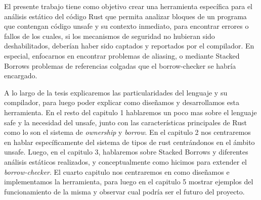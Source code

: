 El presente trabajo tiene como objetivo crear una herramienta específica para el análisis estático del código Rust que permita analizar bloques de un programa que contengan código unsafe y su contexto inmediato, para encontrar errores o fallos de los cuales, si los mecanismos de seguridad no hubieran sido deshabilitados, deberían haber sido captados y reportados por el compilador. En especial, enfocarnos en encontrar problemas de aliasing, o mediante Stacked Borrows problemas de referencias colgadas que el borrow-checker se habría encargado.

A lo largo de la tesis explicaremos las particularidades del lenguaje y su compilador, para luego poder explicar como diseñamos y desarrollamos esta herramienta. En el resto del capitulo 1 hablaremos un poco mas sobre el lenguaje safe y la necesidad del unsafe, junto con las características principales de Rust como lo son el sistema de \textit{ownership} y \textit{borrow}. En el capitulo 2 nos centraremos en hablar específicamente del sistema de tipos de rust centrándonos en el ámbito unsafe. Luego, en el capitulo 3, hablaremos sobre Stacked Borrows \citep{stackedborrows} y diferentes análisis estáticos realizados, y conceptualmente como hicimos para extender el \textit{borrow-checker}. El cuarto capitulo nos centraremos en como diseñamos e implementamos la herramienta, para luego en el capitulo 5 mostrar ejemplos del funcionamiento de la misma y observar cual podría ser el futuro del proyecto.



